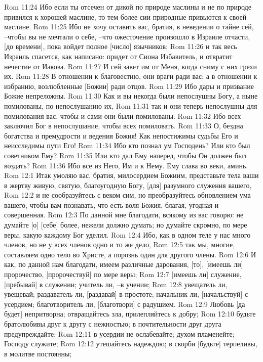 Rom 11:24  Ибо если ты отсечен от дикой по природе маслины и не по природе привился к хорошей маслине, то тем более сии природные привьются к своей маслине.
Rom 11:25  Ибо не хочу оставить вас, братия, в неведении о тайне сей, --чтобы вы не мечтали о себе, --что ожесточение произошло в Израиле отчасти, [до времени], пока войдет полное [число] язычников;
Rom 11:26  и так весь Израиль спасется, как написано: придет от Сиона Избавитель, и отвратит нечестие от Иакова.
Rom 11:27  И сей завет им от Меня, когда сниму с них грехи их.
Rom 11:28  В отношении к благовестию, они враги ради вас; а в отношении к избранию, возлюбленные [Божии] ради отцов.
Rom 11:29  Ибо дары и призвание Божие непреложны.
Rom 11:30  Как и вы некогда были непослушны Богу, а ныне помилованы, по непослушанию их,
Rom 11:31  так и они теперь непослушны для помилования вас, чтобы и сами они были помилованы.
Rom 11:32  Ибо всех заключил Бог в непослушание, чтобы всех помиловать.
Rom 11:33  О, бездна богатства и премудрости и ведения Божия! Как непостижимы судьбы Его и неисследимы пути Его!
Rom 11:34  Ибо кто познал ум Господень? Или кто был советником Ему?
Rom 11:35  Или кто дал Ему наперед, чтобы Он должен был воздать?
Rom 11:36  Ибо все из Него, Им и к Нему. Ему слава во веки, аминь.
Rom 12:1  Итак умоляю вас, братия, милосердием Божиим, представьте тела ваши в жертву живую, святую, благоугодную Богу, [для] разумного служения вашего,
Rom 12:2  и не сообразуйтесь с веком сим, но преобразуйтесь обновлением ума вашего, чтобы вам познавать, что есть воля Божия, благая, угодная и совершенная.
Rom 12:3  По данной мне благодати, всякому из вас говорю: не думайте [о] [себе] более, нежели должно думать; но думайте скромно, по мере веры, какую каждому Бог уделил.
Rom 12:4  Ибо, как в одном теле у нас много членов, но не у всех членов одно и то же дело,
Rom 12:5  так мы, многие, составляем одно тело во Христе, а порознь один для другого члены.
Rom 12:6  И как, по данной нам благодати, имеем различные дарования, [то], [имеешь ли] пророчество, [пророчествуй] по мере веры;
Rom 12:7  [имеешь ли] служение, [пребывай] в служении; учитель ли, --в учении;
Rom 12:8  увещатель ли, увещевай; раздаватель ли, [раздавай] в простоте; начальник ли, [начальствуй] с усердием; благотворитель ли, [благотвори] с радушием.
Rom 12:9  Любовь [да будет] непритворна; отвращайтесь зла, прилепляйтесь к добру;
Rom 12:10  будьте братолюбивы друг к другу с нежностью; в почтительности друг друга предупреждайте;
Rom 12:11  в усердии не ослабевайте; духом пламенейте; Господу служите;
Rom 12:12  утешайтесь надеждою; в скорби [будьте] терпеливы, в молитве постоянны;
